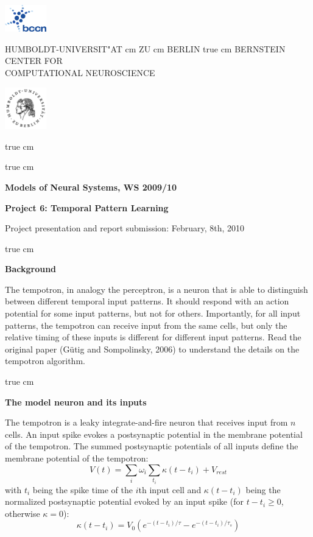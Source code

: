 \documentclass[12pt]{article}
\begin{document}
\parbox{2cm}{
\includegraphics[width=1.8cm]{bccnlogo.pdf}
}
\parbox{11cm}{
\begin{center}
\large HUMBOLDT-UNIVERSIT"AT  cm ZU  cm BERLIN
 true cm
\mgross BERNSTEIN CENTER FOR\\ COMPUTATIONAL NEUROSCIENCE
\end{center}
}
\parbox{2cm}
{
\hfill
\includegraphics[width=1.8cm]{hublogo.pdf}
}

 true cm



 true cm
\centerline{\bf Models of Neural Systems, WS 2009/10}
\centerline{\bf Project 6: Temporal Pattern Learning}
\centerline{Project presentation and report submission: February, 8th, 2010}

 true cm

{\bf Background}

The tempotron, in analogy the perceptron, is a neuron that is able to
distinguish between different temporal input patterns. It should
respond with an action potential for some input patterns, but not for
others. Importantly, for all input patterns, the tempotron can receive
input from the same cells, but only the relative timing of these inputs is
different for different input patterns. Read the original paper
(G\"utig and Sompolinsky, 2006) to understand the details on the
tempotron algorithm.

 true cm

{\bf The model neuron and its inputs} 

The tempotron is a leaky integrate-and-fire neuron that receives input
from $n$ cells. An input spike evokes a postsynaptic potential in the
membrane potential of the tempotron. The summed postsynaptic
potentials of all inputs define the membrane potential of the
tempotron: $$V(t)=\sum_i \omega_i \sum_{t_i}\kappa (t - t_i) +
V_{rest}$$ with $t_i$ being the spike time of the $i$th input cell and
$\kappa (t - t_i)$ being the normalized postsynaptic potential evoked
by an input spike (for $t-t_i \ge0$, otherwise $\kappa =0$): $$\kappa (t -
t_i)=V_0(e^{-(t-t_i)/\tau}-e^{-(t-t_i)/\tau_s})$$
\end{document}
